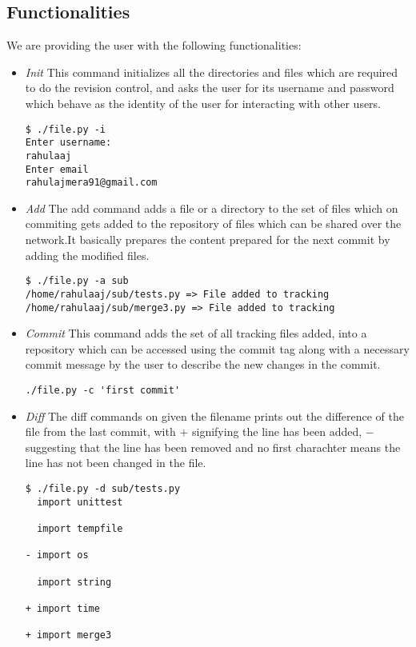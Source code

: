 \documentclass[12pt]{article}
\begin{document}
\subsection{Functionalities}
We are providing the user with the following functionalities:
\begin{itemize}
\item \emph{Init} This command initializes all the directories and files which are required to do the revision control, and asks the user for its username and password which behave as the identity of the user for interacting with other users.
\begin{lstlisting}
$ ./file.py -i
Enter username:
rahulaaj
Enter email 
rahulajmera91@gmail.com
\end{lstlisting}
\item \emph{Add} The add command adds a file or a directory to the set of files which on commiting gets added to the repository of files which can be shared over the network.It basically prepares the content prepared for the next commit by adding the modified files. 
\begin{lstlisting}
$ ./file.py -a sub
/home/rahulaaj/sub/tests.py => File added to tracking
/home/rahulaaj/sub/merge3.py => File added to tracking
\end{lstlisting}
\item \emph{Commit} This command adds the set of all tracking files added, into a repository which can be accessed using the commit tag along with a necessary commit message by the user to describe the new changes in the commit. 
\begin{lstlisting}
./file.py -c 'first commit'
\end{lstlisting}
\item \emph{Diff} The diff commands on given the filename prints out the difference of the file from the last commit, with $+$ signifying the line has been added, $-$ suggesting that the line has been removed and no first charachter means the line has not been changed in the file.
\begin{lstlisting}
$ ./file.py -d sub/tests.py 
  import unittest

  import tempfile

- import os

  import string

+ import time

+ import merge3


\end{lstlisting}
\end{itemize}
\end{document}
